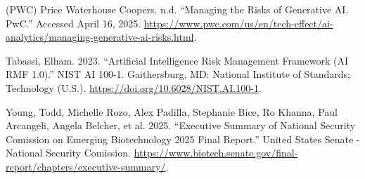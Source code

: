 \documentclass[
]{article}
\newlength{\cslhangindent}
\newenvironment{CSLReferences}[2] %
 {\begin{list}{}{%
  \setlength{\itemindent}{0pt}
  \setlength{\leftmargin}{0pt}
  \setlength{\parsep}{0pt}
  \ifodd #1
   \setlength{\leftmargin}{\cslhangindent}
   \setlength{\itemindent}{-1\cslhangindent}
  \fi
  \setlength{\itemsep}{#2\baselineskip}}}
 {\end{list}}
\begin{document}
\begin{CSLReferences}{1}{0}
(PWC) Price Waterhouse Coopers. n.d. {``Managing the Risks of Generative
{AI}. {PwC}.''} Accessed April 16, 2025.
\url{https://www.pwc.com/us/en/tech-effect/ai-analytics/managing-generative-ai-risks.html}.

Tabassi, Elham. 2023. {``Artificial Intelligence Risk Management
Framework ({AI} {RMF} 1.0).''} {NIST} {AI} 100-1. Gaithersburg, {MD}:
National Institute of Standards; Technology (U.S.).
\url{https://doi.org/10.6028/NIST.AI.100-1}.

Young, Todd, Michelle Rozo, Alex Padilla, Stephanie Bice, Ro Khanna,
Paul Arcangeli, Angela Belcher, et al. 2025. {``Executive Summary of
National Security Comission on Emerging Biotechnology 2025 Final
Report.''} United States Senate - National Security Comission.
\url{https://www.biotech.senate.gov/final-report/chapters/executive-summary/}.

\end{CSLReferences}
\end{document}
